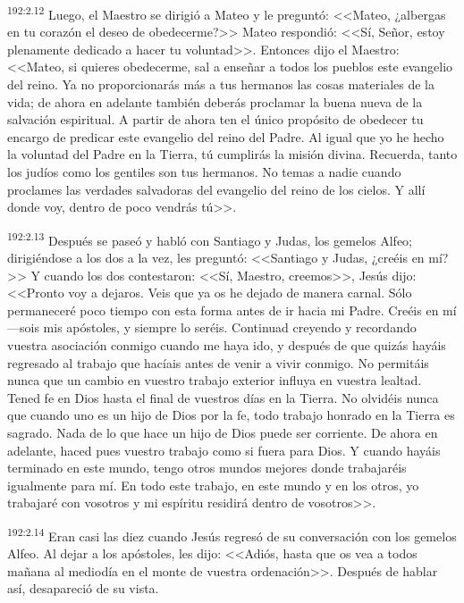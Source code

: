 \par 
\textsuperscript{192:2.12} Luego, el Maestro se dirigió a Mateo y le preguntó: <<Mateo, ¿albergas en tu corazón el deseo de obedecerme?>> Mateo respondió: <<Sí, Señor, estoy plenamente dedicado a hacer tu voluntad>>. Entonces dijo el Maestro: <<Mateo, si quieres obedecerme, sal a enseñar a todos los pueblos este evangelio del reino. Ya no proporcionarás más a tus hermanos las cosas materiales de la vida; de ahora en adelante también deberás proclamar la buena nueva de la salvación espiritual. A partir de ahora ten el único propósito de obedecer tu encargo de predicar este evangelio del reino del Padre. Al igual que yo he hecho la voluntad del Padre en la Tierra, tú cumplirás la misión divina. Recuerda, tanto los judíos como los gentiles son tus hermanos. No temas a nadie cuando proclames las verdades salvadoras del evangelio del reino de los cielos. Y allí donde voy, dentro de poco vendrás tú>>.

\par 
\textsuperscript{192:2.13} Después se paseó y habló con Santiago y Judas, los gemelos Alfeo; dirigiéndose a los dos a la vez, les preguntó: <<Santiago y Judas, ¿creéis en mí?>> Y cuando los dos contestaron: <<Sí, Maestro, creemos>>, Jesús dijo: <<Pronto voy a dejaros. Veis que ya os he dejado de manera carnal. Sólo permaneceré poco tiempo con esta forma antes de ir hacia mi Padre. Creéis en mí ---sois mis apóstoles, y siempre lo seréis. Continuad creyendo y recordando vuestra asociación conmigo cuando me haya ido, y después de que quizás hayáis regresado al trabajo que hacíais antes de venir a vivir conmigo. No permitáis nunca que un cambio en vuestro trabajo exterior influya en vuestra lealtad. Tened fe en Dios hasta el final de vuestros días en la Tierra. No olvidéis nunca que cuando uno es un hijo de Dios por la fe, todo trabajo honrado en la Tierra es sagrado. Nada de lo que hace un hijo de Dios puede ser corriente. De ahora en adelante, haced pues vuestro trabajo como si fuera para Dios. Y cuando hayáis terminado en este mundo, tengo otros mundos mejores donde trabajaréis igualmente para mí. En todo este trabajo, en este mundo y en los otros, yo trabajaré con vosotros y mi espíritu residirá dentro de vosotros>>.

\par 
\textsuperscript{192:2.14} Eran casi las diez cuando Jesús regresó de su conversación con los gemelos Alfeo. Al dejar a los apóstoles, les dijo: <<Adiós, hasta que os vea a todos mañana al mediodía en el monte de vuestra ordenación>>. Después de hablar así, desapareció de su vista.

